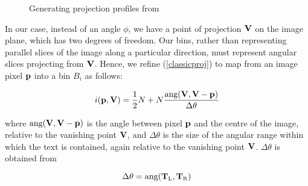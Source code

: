 \begin{figure}[t]
\centering
\begin{center}
\end{center}
\vspace*{0mm}
\caption{Generating projection profiles from }
\label{projprofsfig}
\end{figure}




In our case, instead of an angle $\phi$, we have a point of projection
${ \bf V }$ on the image plane, which has two degrees of freedom.  Our bins,
rather than representing parallel slices of the image along a particular
direction, must represent angular slices projecting from ${ \bf V }$.  Hence, we
refine (\ref{classicproj}) to map from an image pixel ${ \bf p }$ into a bin
$B_i$ as follows:


\begin{equation} \label{persproj} i( { \bf p,{ \bf V } } ) = \frac{1}{2} N + N \frac{ \mbox{ang}({ \bf V },{ \bf V }-{ \bf p }) }{ \Delta \theta } \end{equation}

{ \parindent 0mm 
where $\mbox{ang}({ \bf V },{ \bf V }-{ \bf p })$ is the angle
between pixel ${ \bf p }$ and the centre of the image, relative to the vanishing
point ${ \bf V }$, and $\Delta \theta$ is the size of the angular range within
which the text is contained, again relative to the vanishing point
${ \bf V }$. $ \Delta \theta$ is obtained from 
}

\begin{equation} \Delta \theta = \mbox{ang}(\myvec{T}_{\mbox{\tiny L}},\myvec{T}_{\mbox{\tiny R}}) \end{equation}

